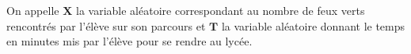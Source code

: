 \documentclass[palatino,code]{ensaexam}
\begin{document}
\begin{questions}
On appelle $\mathbf{X}$ la variable aléatoire correspondant au nombre  de feux verts
rencontrés par l'élève sur son parcours et $\mathbf{T}$  la variable aléatoire
donnant le temps  en minutes mis par l'élève pour se rendre au lycée.


 \end{questions}
\end{document}
